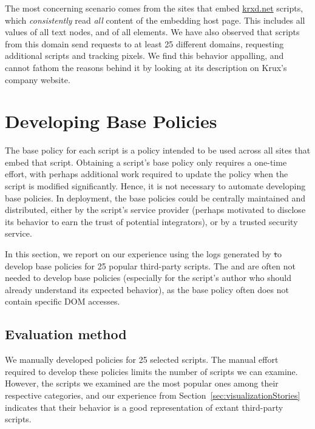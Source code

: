 The most concerning scenario comes from the sites that embed
\url{krxd.net} scripts, which \emph{consistently} read \emph{all}
content of the embedding host page.  This includes all values of all
text nodes, and  of all elements.  We have also observed
that scripts from this domain send requests to at least 25 different
domains, requesting additional scripts and tracking pixels.  We find
this behavior appalling, and cannot fathom the reasons behind it by
looking at its description on Krux's company website.

\section{Developing Base Policies}
\label{sec:pg}

The base policy for each script is a policy intended to be used across
all sites that embed that script.  Obtaining a script's base policy only
requires a one-time effort, with perhaps additional work required to
update the policy when the script is modified significantly.  Hence, it
is not necessary to automate developing base policies.  In deployment,
the base policies could be centrally maintained and distributed, either
by the script's service provider (perhaps motivated to disclose its
behavior to earn the trust of potential integrators), or by a trusted
security service.

In this section, we report on our experience using the logs generated by
\st to develop base policies for 25 popular third-party scripts.  The
\pg and \vis are often not needed to develop base policies (especially
for the script's author who should already understand its expected
behavior), as the base policy often does not contain specific DOM
accesses.

\subsection{Evaluation method} 
\label{sec:evalApproach}

We manually developed policies for 25 selected scripts.  The manual
effort required to develop these policies limits the number of scripts
we can examine.  However, the scripts we examined are the most popular
ones among their respective categories, and our experience from
Section~\ref{sec:visualizationStories} indicates that their behavior is
a good representation of extant third-party scripts.

\renewcommand*{\UrlFont}{\ttfamily\smaller\relax}

